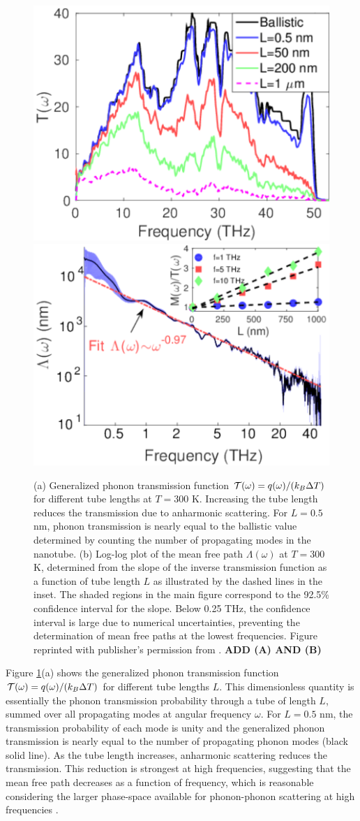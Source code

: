 \begin{figure}[tb]
 \begin{center}
  \includegraphics[width=.49\columnwidth]{pics/cnt_fig2.pdf} 
  \includegraphics[width=.49\columnwidth]{pics/cnt_fig4.pdf} 
  \caption{(a) Generalized phonon transmission function $\mathcal{T}(\omega)=q(\omega)/(k_B\Delta T)$ for different tube lengths at $T=300$ K. Increasing the tube length reduces the transmission due to anharmonic scattering. For $L=0.5$ nm, phonon transmission is nearly equal to the ballistic value determined by counting the number of propagating modes in the nanotube. (b) Log-log plot of the mean free path $\Lambda(\omega)$ at $T=300$ K, determined from the slope of the inverse transmission function as a function of tube length $L$ as illustrated by the dashed lines in the inset. The shaded regions in the main figure correspond to the 92.5\% confidence interval for the slope. Below 0.25 THz, the confidence interval is large due to numerical uncertainties, preventing the determination of mean free paths at the lowest frequencies. Figure reprinted with publisher's permission from . \textbf{ADD (A) AND (B)}}  
\label{fig:cnt_fig2}
 \end{center}
\end{figure}

Figure \ref{fig:cnt_fig2}(a) shows the generalized phonon transmission function $\mathcal{T}(\omega)=q(\omega)/(k_B\Delta T)$ for different tube lengths $L$. This dimensionless quantity is essentially the phonon transmission probability through a tube of length $L$, summed over all propagating modes at angular frequency $\omega$. For $L=0.5$ nm, the transmission probability of each mode is unity and the generalized phonon transmission is nearly equal to the number of propagating phonon modes (black solid line). As the tube length increases, anharmonic scattering reduces the transmission. This reduction is strongest at high frequencies, suggesting that the mean free path decreases as a function of frequency, which is reasonable considering the larger phase-space available for phonon-phonon scattering at high frequencies \cite{ziman}.

